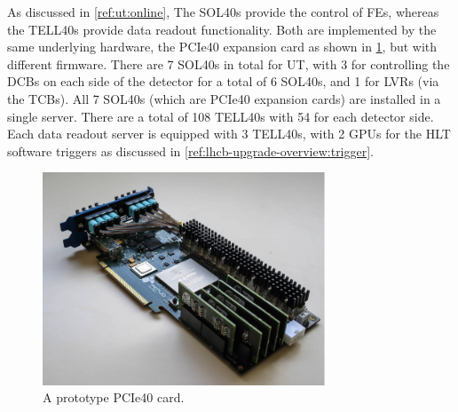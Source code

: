 As discussed in \cref{ref:ut:online},
The SOL40s provide the control of FEs, whereas the TELL40s provide data
readout functionality.
Both are implemented by the same underlying hardware,
the PCIe40 expansion card as shown in \cref{fig:pcie40},
but with different firmware.
There are 7 SOL40s in total for UT,
with 3 for controlling the DCBs on each side of the detector for a total of 6
SOL40s,
and 1 for LVRs (via the TCBs).
All 7 SOL40s (which are PCIe40 expansion cards) are installed in a single
server.
There are a total of 108 TELL40s with 54 for each detector side.
Each data readout server is equipped with 3 TELL40s,
with 2 GPUs for the HLT software triggers
as discussed in \cref{ref:lhcb-upgrade-overview:trigger}.

\begin{figure}[!htb]
    \centering
    \includegraphics[width=0.75\textwidth]{./figs-ut-upgrade/online/pcie40.pdf}
    \caption{
        A prototype PCIe40 card.
    }
    \label{fig:pcie40}
\end{figure}


%




